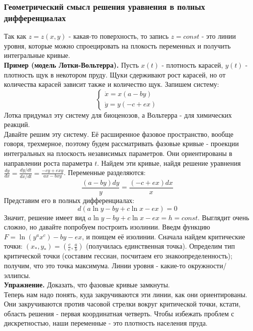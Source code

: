 \subsubsection{Геометрический смысл решения уравнения в полных дифференциалах}
Так как $z=z(x,y)$ - какая-то поверхность, то запись  $z=const$ - это линии
уровня, которые можно спроецировать на плокость переменных и получить 
интегральные кривые.\\
\textbf{Пример (модель Лотки-Вольтерра).} Пусть $x(t)$ - плотность карасей,
 $y(t)$ - плотность щук в некотором пруду. Щуки сдерживают рост карасей,
но от количества карасей зависит также и количество щук. Запишем систему:
$$\begin{cases} \label{lotka_volterra}
    \dot{x}=x(a-by)\\
    \dot{y}=y(-c+ex)
\end{cases}$$
Лотка придумал эту систему для биоценозов, а Вольтерра - для химических
реакций.\\
Давайте решим эту систему. Её расширенное фазовое пространство, вообще говоря,
трехмерное, поэтому будем рассматривать фазовые кривые - проекции интегральных 
на плоскость независимых параметров. Они ориентированы в направлении роста
параметра $t$. Найдем эти кривые, найдя решение уравнения 
$\frac{dy}{dx}=\frac{dy /dt}{dx /dt}=\frac{-cy+exy}{ax-bxy}$. 
Переменные разделяются: $$\frac{(a-by)dy}{y}=\frac{(-c+ex)dx}{x}$$ 
Представим его в полных дифференциалах: 
$$d\left( a\ln y-by+c\ln x -ex \right)=0$$
Значит, решение имеет вид $a\ln y-by+c\ln x-ex=h=const$.
Выглядит очень сложно, но давайте попробуем построить изолинии. 
Введм функцию $F=\ln{(y^ax^c)}-by-ex$, и поищем её изолинии. Сначала найдем
критические точки: $(x_*,y_*)=(\frac{c}{e},\frac{a}{b})$ (получилась 
единственная точка). Определим тип критической точки (составим гессиан, 
посчитаем его знакоопределенность); получим, что это точка максимума.
Линии уровня - какие-то окружности/эллипсы.\\
%    
\textbf{Упражнение.} Доказать, что фазовые кривые замкнуты.\\
Теперь нам надо понять, куда закручиваются эти линии, как они ориентированы.
Они закручиваются против часовой стрелки вокруг критической точки, кстати,
область решения - первая координатная четверть. Чтобы избежать проблем с 
дискретностью, наши переменные - это плотность населения пруда. 

 



